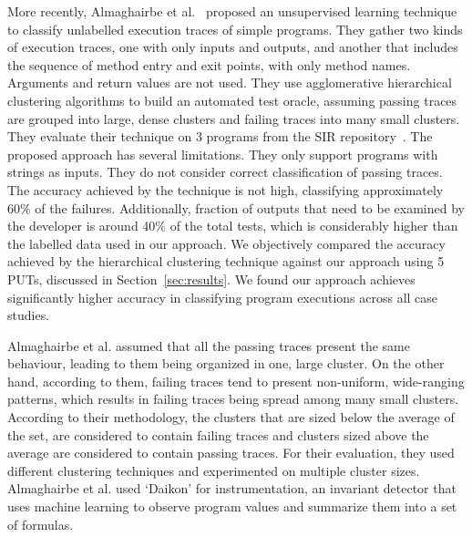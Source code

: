 More recently, Almaghairbe et al.~\cite{almaghairbe2017separating} proposed an unsupervised learning technique to classify unlabelled execution traces of simple programs. They gather two kinds of execution traces, one with only inputs and outputs, and another that includes the sequence of method entry and exit points, with only method names. Arguments and return values are not used. %
They use agglomerative hierarchical clustering algorithms to build an automated test oracle, assuming passing traces are grouped into large, dense clusters and failing traces into many small clusters. They evaluate their technique on 3 programs from the SIR repository~\cite{sir}. The proposed approach has several limitations. They only support programs with strings as inputs. 
They do not consider correct classification of passing traces.
The accuracy achieved by the technique is not high, classifying approximately 60\% of the failures. Additionally, fraction of outputs that need to be examined by the developer is around 40\% of the total tests, which is considerably higher than the labelled data used in our approach. 
We objectively compared the accuracy achieved by the hierarchical clustering technique against our approach using 5 PUTs, discussed in Section~\ref{sec:results}. We found our approach achieves significantly higher accuracy in classifying program executions across all case studies. 

\iffalse
Almaghairbe et al. assumed that all the passing traces present the same behaviour, leading to them being organized in one, large cluster. On the other hand, according to them, failing traces tend to present non-uniform, wide-ranging patterns, which results in failing traces being spread among many small clusters. According to their methodology, the clusters that are sized below the average of the set, are considered to contain failing traces and clusters sized above the average are considered to contain passing traces. For their evaluation, they used different clustering techniques and experimented on multiple cluster sizes. Almaghairbe et al. used `Daikon' for instrumentation, an invariant detector that uses machine learning to observe program values and summarize them into a set of formulas.

